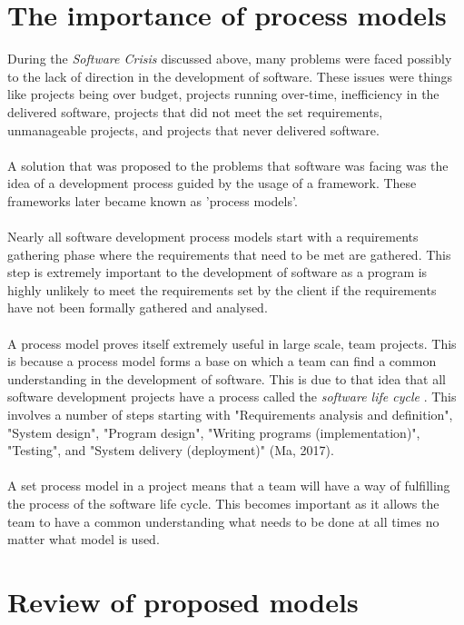 \documentclass{CRPITStyle}
\begin{document}
	\section {The importance of process models}
		During the \textit {Software Crisis} discussed above, many problems were faced possibly to the lack of direction in the
		development of software. These issues were things like projects being over budget, projects running over-time,
		inefficiency in the delivered software, projects that did not meet the set requirements, unmanageable projects, and
		projects that never delivered software. \\
		~\\
		 A solution that was proposed to the problems that software was facing was the idea
		of a development process guided by the usage of a framework. These frameworks later became known as 'process
		models'. \\
		~\\
		Nearly all software development process models start with a requirements gathering phase where the requirements that
		need to be met are gathered. This step is extremely important to the development of software as a program is highly
		unlikely to meet the requirements set by the client if the requirements have not been formally gathered and analysed.\\
		~\\
		A process model proves itself extremely useful in large scale, team projects. This is because a process model forms a 
		base on which a team can find a common understanding in the development of software. This is due to that idea that all
		software development projects have a process called the \textit{ software life cycle }. This involves a number of steps
		starting with "Requirements analysis and definition", "System design", "Program design", "Writing programs 
		(implementation)", "Testing", and "System delivery (deployment)" (Ma, 2017).\\
		~\\
		A set process model in a project means that a team will have a way of fulfilling the process of the software life cycle.
		This becomes important as it allows the team to have a common understanding what needs to be done at all times no
		matter what model is used. 

	\section {Review of proposed models}
\end{document}
